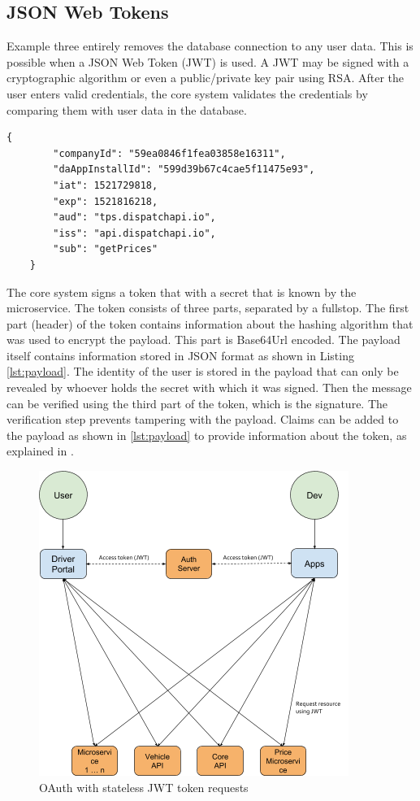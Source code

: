 \subsection{JSON Web Tokens}
Example three entirely removes the database connection to any user data. This is possible when a JSON Web Token (JWT) is used. A JWT may be signed with a cryptographic algorithm or even a public/private key pair using RSA. After the user enters valid credentials, the core system validates the credentials by comparing them with user data in the database.

\begin{lstlisting}[caption={Two user identifiers and registered claim names stored inside the payload of a JSON web token.}, label={lst:payload}]
	{
		"companyId": "59ea0846f1fea03858e16311",
		"daAppInstallId": "599d39b67c4cae5f11475e93",
		"iat": 1521729818,
		"exp": 1521816218,
		"aud": "tps.dispatchapi.io",
		"iss": "api.dispatchapi.io",
		"sub": "getPrices"
	}
\end{lstlisting}

The core system signs a token that with a secret that is known by the microservice. The token consists of three parts, separated by a fullstop. The first part (header) of the token contains information about the hashing algorithm that was used to encrypt the payload. This part is Base64Url encoded. The payload itself contains information stored in JSON format as shown in Listing \ref{lst:payload}. The identity of the user is stored in the payload that can only be revealed by whoever holds the secret with which it was signed. Then the message can be verified using the third part of the token, which is the signature. The verification step prevents tampering with the payload. Claims can be added to the payload as shown in \ref{lst:payload} to provide information about the token, as explained in \cite{JWT}.

\begin{figure}[H]
	\centering
	\includegraphics[width=.7\textwidth]{Auth2}
	\caption[Stateless JWT]{OAuth with stateless JWT token requests}
	\label{fig:Auth2}
\end{figure}

